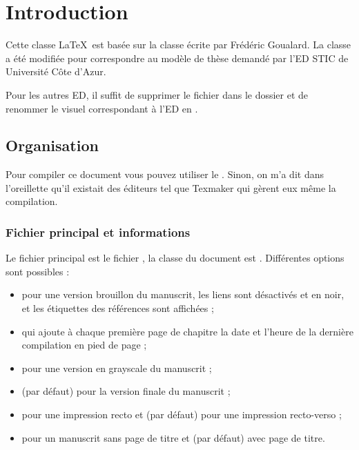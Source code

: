 
\chapter{Introduction}

Cette classe \LaTeX\ est basée sur la classe  écrite par Frédéric Goualard. La classe a été modifiée pour correspondre au modèle de thèse demandé par l'ED STIC de Université Côte d'Azur.

Pour les autres ED, il suffit de supprimer le fichier  dans le dossier  et de renommer le visuel correspondant à l'ED en .

\section{Organisation}

  Pour compiler ce document vous pouvez utiliser le . Sinon, on m'a dit dans l'oreillette qu'il existait des éditeurs tel que Texmaker qui gèrent eux même la compilation.

  \subsection{Fichier principal et informations}
  Le fichier principal est le fichier , la classe du document est .
  Différentes options sont possibles :
  \begin{itemize}
    \item {} pour une version brouillon du manuscrit, les liens sont désactivés et en noir, et les étiquettes des références sont affichées ;
    \item {} qui ajoute à chaque première page de chapitre la date et l'heure de la dernière compilation en pied de page ;
    \item {} pour une version en grayscale du manuscrit ;
    \item {} (par défaut) pour la version finale du manuscrit ;
    \item {} pour une impression recto et  (par défaut) pour une impression recto-verso ;
    \item {} pour un manuscrit sans page de titre et  (par défaut) avec page de titre.
  \end{itemize}

